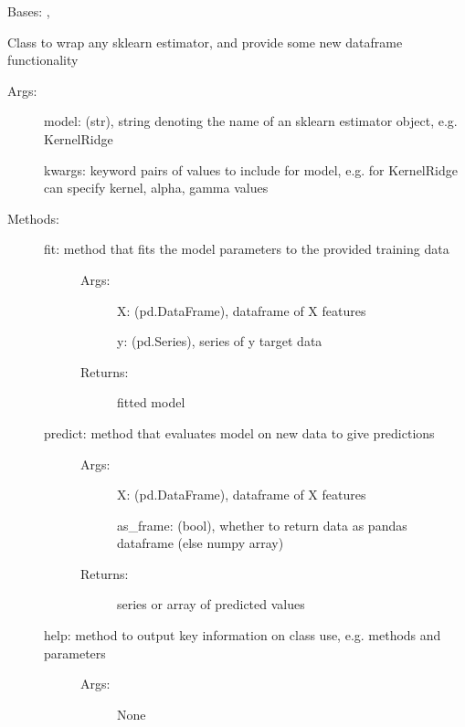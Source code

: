 \documentclass[letterpaper,10pt,english]{sphinxmanual}
\begin{document}
\begin{fulllineitems}
\label{\detokenize{api/mastml.models.SklearnModel:mastml.models.SklearnModel}}
Bases: , 

Class to wrap any sklearn estimator, and provide some new dataframe functionality
\begin{description}
\item[{Args:}] \leavevmode
model: (str), string denoting the name of an sklearn estimator object, e.g. KernelRidge

kwargs: keyword pairs of values to include for model, e.g. for KernelRidge can specify kernel, alpha, gamma values

\item[{Methods:}] \leavevmode\begin{description}
\item[{fit: method that fits the model parameters to the provided training data}] \leavevmode\begin{description}
\item[{Args:}] \leavevmode
X: (pd.DataFrame), dataframe of X features

y: (pd.Series), series of y target data

\item[{Returns:}] \leavevmode
fitted model

\end{description}

\item[{predict: method that evaluates model on new data to give predictions}] \leavevmode\begin{description}
\item[{Args:}] \leavevmode
X: (pd.DataFrame), dataframe of X features

as\_frame: (bool), whether to return data as pandas dataframe (else numpy array)

\item[{Returns:}] \leavevmode
series or array of predicted values

\end{description}

\item[{help: method to output key information on class use, e.g. methods and parameters}] \leavevmode\begin{description}
\item[{Args:}] \leavevmode
None


\end{description}
\end{description}
\end{description}
\end{fulllineitems}
\end{document}
